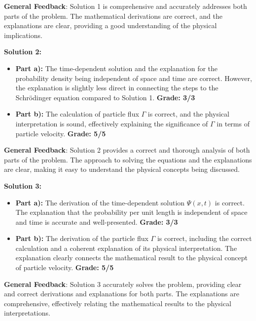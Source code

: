 \documentclass[a4paper,11pt]{article}
\begin{document}
\textbf{General Feedback}: Solution 1 is comprehensive and accurately addresses both parts of the problem. The mathematical derivations are correct, and the explanations are clear, providing a good understanding of the physical implications.

\hrulefill

\textbf{Solution 2:}

\begin{itemize}
    \item \textbf{Part a):} The time-dependent solution and the explanation for the probability density being independent of space and time are correct. However, the explanation is slightly less direct in connecting the steps to the Schrödinger equation compared to Solution 1. \textbf{Grade: 3/3}
    \item \textbf{Part b):} The calculation of particle flux $\Gamma$ is correct, and the physical interpretation is sound, effectively explaining the significance of $\Gamma$ in terms of particle velocity. \textbf{Grade: 5/5}
\end{itemize}

\textbf{General Feedback}: Solution 2 provides a correct and thorough analysis of both parts of the problem. The approach to solving the equations and the explanations are clear, making it easy to understand the physical concepts being discussed.

\hrulefill

\textbf{Solution 3:}

\begin{itemize}
    \item \textbf{Part a):} The derivation of the time-dependent solution $\Psi(x,t)$ is correct. The explanation that the probability per unit length is independent of space and time is accurate and well-presented. \textbf{Grade: 3/3}
    \item \textbf{Part b):} The derivation of the particle flux $\Gamma$ is correct, including the correct calculation and a coherent explanation of its physical interpretation. The explanation clearly connects the mathematical result to the physical concept of particle velocity. \textbf{Grade: 5/5}
\end{itemize}

\textbf{General Feedback}: Solution 3 accurately solves the problem, providing clear and correct derivations and explanations for both parts. The explanations are comprehensive, effectively relating the mathematical results to the physical interpretations.
\end{document}
